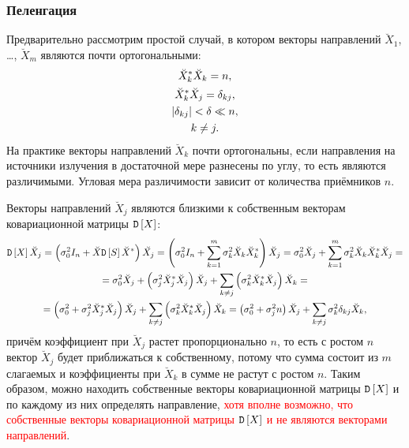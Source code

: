 \subsubsection{Пеленгация}

Предварительно рассмотрим простой случай, в котором векторы направлений $\breve{X}_1$, \dots, $\breve{X}_m$ являются почти ортогональными:
\begin{gather*}
    \breve{X}_k^* \breve{X}_k = n, \\
    \breve{X}_k^* \breve{X}_j = \delta_{kj}, \\
    \left | \delta_{kj} \right | < \delta \ll n, \\
    k \neq j .
\end{gather*}
На практике векторы направлений $\breve{X}_k$ почти ортогональны, если направления на источники излучения в достаточной мере разнесены по углу, то есть являются
различимыми. Угловая мера различимости зависит от количества приёмников $n$.

Векторы направлений $\breve{X}_j$ являются близкими к собственным векторам ковариационной матрицы $\mathtt{D} \left [ X \right ]$:
\begin{multline*}
    \mathtt{D} \left [ X \right ] \breve{X}_j
    = \left( \sigma_0^2 I_n + \breve{X} \mathtt{D} \left [ S \right ] \breve{X}^* \right) \breve{X_j}
    = \left( \sigma_0^2 I_n + \sum_{k=1}^m \sigma_k^2 \breve{X}_k \breve{X}_k^* \right) \breve{X}_j
    = \sigma_0^2 \breve{X}_j + \sum_{k=1}^m \sigma_k^2 \breve{X}_k \breve{X}_k^* \breve{X}_j = \\
    = \sigma_0^2 \breve{X}_j + \left( \sigma_j^2 \breve{X}_j^* \breve{X}_j \right) \breve{X}_j + \sum_{k \neq j} \left( \sigma_k^2 \breve{X}_k^* \breve{X}_j \right) \breve{X}_k = \\
    = \left( \sigma_0^2 + \sigma_j^2 \breve{X}_j^* \breve{X}_j \right) \breve{X}_j + \sum_{k \neq j} \left( \sigma_k^2 \breve{X}_k^* \breve{X}_j \right) \breve{X}_k
    = \left( \sigma_0^2 + \sigma_j^2 n \right) \breve{X}_j + \sum_{k \neq j} \sigma_k^2 \delta_{kj} \breve{X}_k ,
\end{multline*}
причём коэффициент при $\breve{X}_j$ растет пропорционально $n$, то есть с ростом $n$ вектор $\breve{X}_j$ будет приближаться к собственному, потому что сумма состоит из $m$
слагаемых и коэффициенты при $\breve{X}_k$ в сумме не растут с ростом $n$. Таким образом, можно находить собственные векторы ковариационной матрицы $\mathtt{D} \left [ X \right ]$ и по каждому
из них определять направление, \textcolor{red}{хотя вполне возможно, что собственные векторы ковариационной матрицы $\mathtt{D} \left [ X \right ]$ и не являются векторами направлений}.

